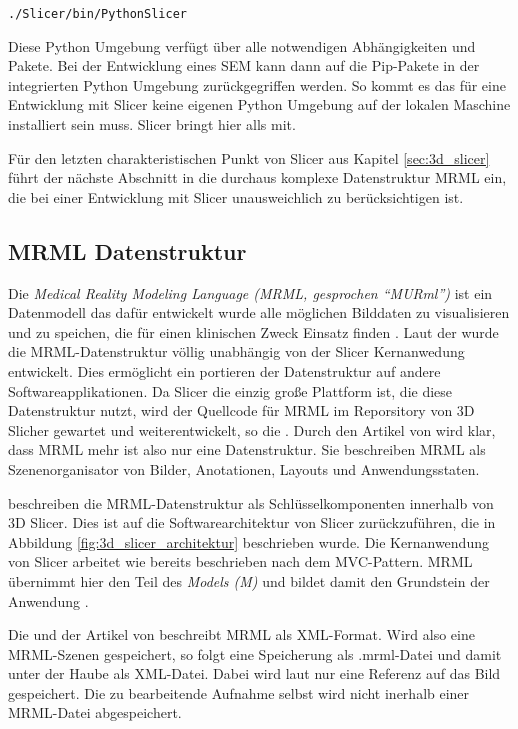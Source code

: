 \texttt{./Slicer/bin/PythonSlicer}

Diese Python Umgebung verfügt über alle notwendigen Abhängigkeiten und Pakete.
Bei der Entwicklung eines SEM kann dann auf die Pip-Pakete in der integrierten
Python Umgebung zurückgegriffen werden. So kommt es das für eine Entwicklung mit
Slicer keine eigenen Python Umgebung auf der lokalen Maschine installiert sein muss.
Slicer bringt hier alls mit.

Für den letzten charakteristischen Punkt von Slicer aus Kapitel
\ref{sec:3d_slicer} führt der nächste Abschnitt in die durchaus komplexe
Datenstruktur MRML ein, die bei einer Entwicklung mit Slicer unausweichlich zu berücksichtigen
ist.

\subsection{MRML Datenstruktur}
\label{subsec:mrml_datenstruktur} Die \textit{Medical Reality Modeling Language
(MRML, gesprochen “MURml”)} ist ein Datenmodell das dafür entwickelt wurde alle
möglichen Bilddaten zu visualisieren und zu speichen, die für einen klinischen Zweck
Einsatz finden \citep[vgl.][]{slicer2024}. Laut der \citet{slicer2024} wurde die
MRML-Datenstruktur völlig unabhängig von der Slicer Kernanwedung entwickelt. Dies
ermöglicht ein portieren der Datenstruktur auf andere Softwareapplikationen. Da
Slicer die einzig große Plattform ist, die diese Datenstruktur nutzt, wird der
Quellcode für MRML im Reporsitory von 3D Slicher gewartet und weiterentwickelt, so
die \citet{slicer2024}. Durch den Artikel von \citet[Seite 1327]{fedorov2012slicer}
wird klar, dass MRML mehr ist also nur eine Datenstruktur. Sie beschreiben MRML als
Szenenorganisator von Bilder, Anotationen, Layouts und Anwendungsstaten.

\citet[Seite 1331]{fedorov2012slicer} beschreiben die MRML-Datenstruktur als Schlüsselkomponenten
innerhalb von 3D Slicer. Dies ist auf die Softwarearchitektur von Slicer
zurückzuführen, die in Abbildung \ref{fig:3d_slicer_architektur} beschrieben wurde.
Die Kernanwendung von Slicer arbeitet wie bereits beschrieben nach dem MVC-Pattern.
MRML übernimmt hier den Teil des \textit{Models (M)} und bildet damit den
Grundstein der Anwendung \citep[vgl.][Seite 1332]{fedorov2012slicer}.

Die \citet{slicer2024} und der Artikel von \citet[Seite 1327]{fedorov2012slicer}
beschreibt MRML als XML-Format. Wird also eine MRML-Szenen gespeichert, so folgt
eine Speicherung als .mrml-Datei und damit unter der Haube als XML-Datei. Dabei wird
laut \citet{slicer2024} nur eine Referenz auf das Bild gespeichert. Die zu bearbeitende
Aufnahme selbst wird nicht inerhalb einer MRML-Datei abgespeichert.

